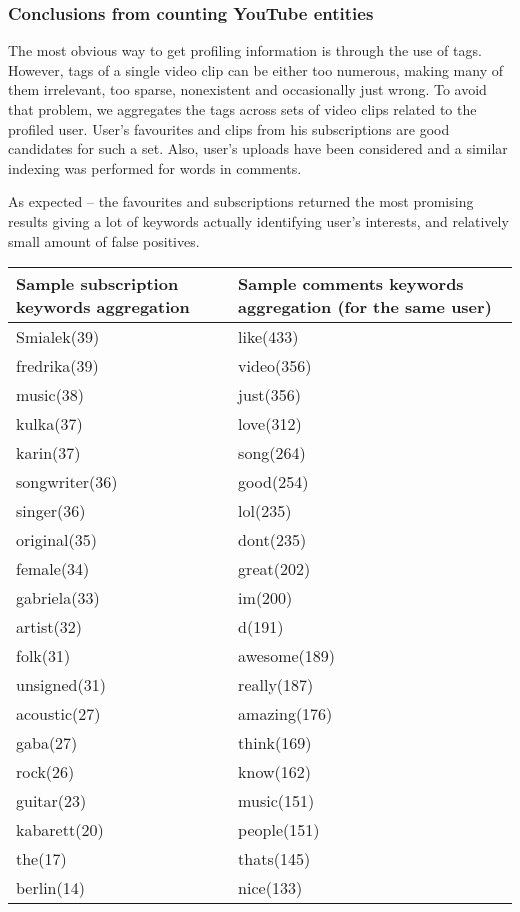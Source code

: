\documentclass{article}
\begin{document}
\subsubsection{Conclusions from counting YouTube entities}
The most obvious way to get profiling information is through the use of
tags. However, tags of a single video clip can be either too numerous, making many
of them irrelevant, too sparse, nonexistent and occasionally just wrong. To avoid
that problem, we aggregates the tags across sets of video clips related to the
profiled user. User's favourites and clips from his subscriptions are good
candidates for such a set. Also, user's uploads have been considered and a
similar indexing was performed for words in comments.

As expected -- the favourites and subscriptions returned the most promising results
giving a lot of keywords actually identifying user's interests, and relatively
small amount of false positives.

\begin{tabular}{p{5cm} p{5cm}}
Sample subscription keywords aggregation & Sample comments keywords aggregation
(for the same user) \\ \hline
Smialek(39) & like(433) \\
fredrika(39) & video(356) \\
music(38) & just(356) \\
kulka(37) & love(312) \\
karin(37) & song(264) \\
songwriter(36) & good(254) \\
singer(36) & lol(235) \\
original(35) & dont(235) \\
female(34) & great(202) \\
gabriela(33) & im(200) \\
artist(32) & d(191) \\
folk(31) & awesome(189) \\
unsigned(31) & really(187) \\
acoustic(27) & amazing(176) \\
gaba(27) & think(169) \\
rock(26) & know(162) \\
guitar(23) & music(151) \\
kabarett(20) & people(151) \\
the(17) & thats(145) \\
berlin(14) & nice(133) \\
\end{tabular}
\end{document}
